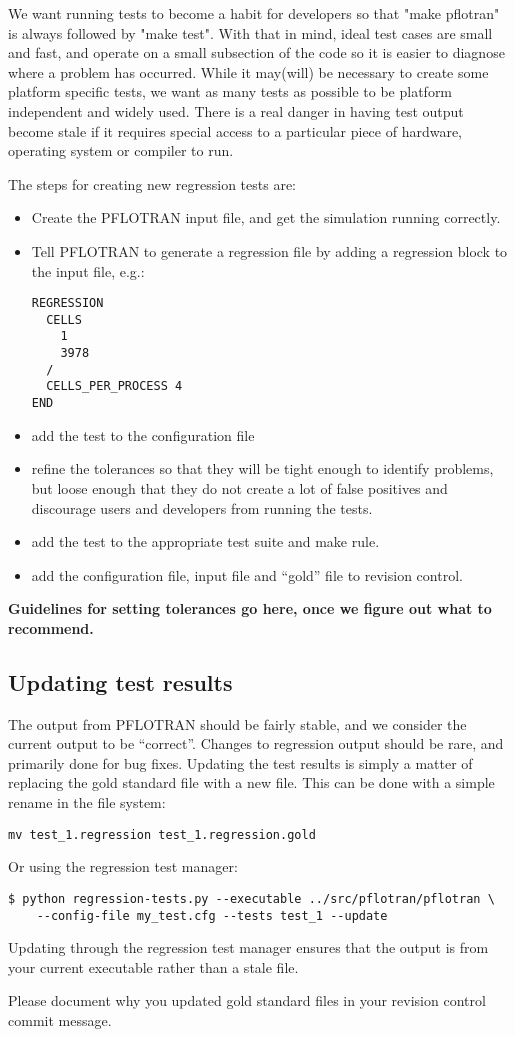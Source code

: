 We want running tests to become a habit for developers so that "make
pflotran" is always followed by "make test". With that in mind, ideal
test cases are small and fast, and operate on a small subsection of
the code so it is easier to diagnose where a problem has
occurred. While it may(will) be necessary to create some platform
specific tests, we want as many tests as possible to be platform
independent and widely used. There is a real danger in having test
output become stale if it requires special access to a particular
piece of hardware, operating system or compiler to run.

The steps for creating new regression tests are:
\begin{itemize}
\item Create the PFLOTRAN input file, and get the simulation running
  correctly.

\item Tell PFLOTRAN to generate a regression file by adding a
  regression block to the input file, e.g.:
\begin{verbatim}
REGRESSION
  CELLS 
    1
    3978
  /
  CELLS_PER_PROCESS 4
END
\end{verbatim}

\item add the test to the configuration file

\item refine the tolerances so that they will be tight enough to
  identify problems, but loose enough that they do not create a lot of
  false positives and discourage users and developers from running the
  tests.

\item add the test to the appropriate test suite and make rule.

\item add the configuration file, input file and ``gold'' file to revision control.

\end{itemize}

\textbf{Guidelines for setting tolerances go here, once we figure out what to recommend.}

\subsection{Updating test results}
The output from PFLOTRAN should be fairly stable, and we consider the
current output to be ``correct''. Changes to regression output should
be rare, and primarily done for bug fixes. Updating the test results
is simply a matter of replacing the gold standard file with a new
file. This can be done with a simple rename in the file system:
\begin{verbatim}
mv test_1.regression test_1.regression.gold
\end{verbatim}
Or using the regression test manager:
\begin{verbatim}
$ python regression-tests.py --executable ../src/pflotran/pflotran \
    --config-file my_test.cfg --tests test_1 --update
\end{verbatim}
Updating through the regression test manager ensures that the output
is from your current executable rather than a stale file.

Please document why you updated gold standard files in
your revision control commit message.
